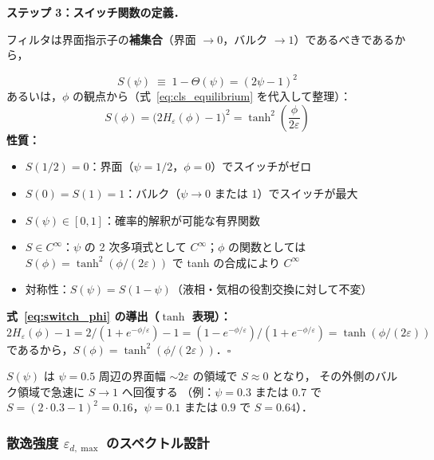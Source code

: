 \medskip
\noindent\textbf{ステップ 3：スイッチ関数の定義．}

フィルタは界面指示子の\textbf{補集合}（界面 $\to 0$，バルク $\to 1$）であるべきであるから，

\begin{tcolorbox}[defbox, title={スイッチ関数 $S(\psi)$（CLS 平衡プロファイルからの導出）}]
\label{defbox:switch}
\begin{equation}
  \boxed{
    S(\psi) \;\equiv\; 1 - \Theta(\psi) = (2\psi - 1)^2
  }
  \label{eq:switch_function}
\end{equation}
あるいは，$\phi$ の観点から（式~\eqref{eq:cls_equilibrium} を代入して整理）：
\begin{equation}
  S(\phi) = \bigl(2H_\varepsilon(\phi) - 1\bigr)^2 = \tanh^2\!\left(\frac{\phi}{2\varepsilon}\right)
  \label{eq:switch_phi}
\end{equation}
\textbf{性質：}
\begin{itemize}
  \item $S(1/2) = 0$：界面（$\psi = 1/2$，$\phi = 0$）でスイッチがゼロ
  \item $S(0) = S(1) = 1$：バルク（$\psi \to 0$ または $1$）でスイッチが最大
  \item $S(\psi) \in [0,1]$：確率的解釈が可能な有界関数
  \item $S \in C^\infty$：$\psi$ の 2 次多項式として $C^\infty$；$\phi$ の関数としては $S(\phi) = \tanh^2(\phi/(2\varepsilon))$ で tanh の合成により $C^\infty$
  \item 対称性：$S(\psi) = S(1-\psi)$（液相・気相の役割交換に対して不変）
\end{itemize}
\end{tcolorbox}

\noindent\textbf{式~\eqref{eq:switch_phi} の導出（$\tanh$ 表現）：}
$2H_\varepsilon(\phi) - 1 = 2/(1+e^{-\phi/\varepsilon}) - 1
= (1 - e^{-\phi/\varepsilon})/(1 + e^{-\phi/\varepsilon})
= \tanh(\phi/(2\varepsilon))$
であるから，$S(\phi) = \tanh^2(\phi/(2\varepsilon))$．$\square$

\medskip
$S(\psi)$ は $\psi = 0.5$ 周辺の界面幅 $\sim 2\varepsilon$ の領域で $S \approx 0$ となり，
その外側のバルク領域で急速に $S \to 1$ へ回復する
（例：$\psi = 0.3$ または $0.7$ で $S = (2\cdot 0.3-1)^2 = 0.16$，$\psi = 0.1$ または $0.9$ で $S = 0.64$）．

\subsubsection{散逸強度 $\varepsilon_{d,\max}$ のスペクトル設計}
\label{sec:dccd_eps_design}

